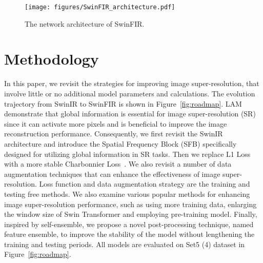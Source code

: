 \documentclass[10pt,twocolumn,letterpaper]{article}
\begin{document}
\begin{figure*}[t]
	\centering
	\texttt{[image: figures/SwinFIR\_architecture.pdf]}
	\vspace{-3mm}
	\caption{The network architecture of SwinFIR.} 
	\label{fig:SwinFIR_architecture}
	\vspace{-3mm}
\end{figure*}


\section{Methodology}
In this paper, we revisit the strategies for improving image super-resolution, that involve little or no additional model parameters and calculations. The evolution trajectory from SwinIR to SwinFIR is shown in Figure~\ref{fig:roadmap}. LAM~\cite{gu2021interpreting} demonstrate that global information is essential for image super-resolution (SR) since it can activate more pixels and is beneficial to improve the image reconstruction performance. Consequently, we first revisit the SwinIR architecture and introduce the Spatial Frequency Block (SFB) specifically designed for utilizing global information in SR tasks. Then we replace L1 Loss with a more stable Charbonnier Loss~\cite{lai2018fast}. We also revisit a number of data augmentation techniques that can enhance the effectiveness of image super-resolution. 
Loss function and data augmentation strategy are the training and testing free methods. 
We also examine various popular methods for enhancing image super-resolution performance, such as using more training data, enlarging the window size of Swin Transformer and employing pre-training model. Finally, inspired by self-ensemble, we propose a novel post-processing technique, named feature ensemble, to improve the stability of the model without lengthening the training and testing periods. All models are evaluated on Set5 (4) dataset in Figure~\ref{fig:roadmap}.
\end{document}
